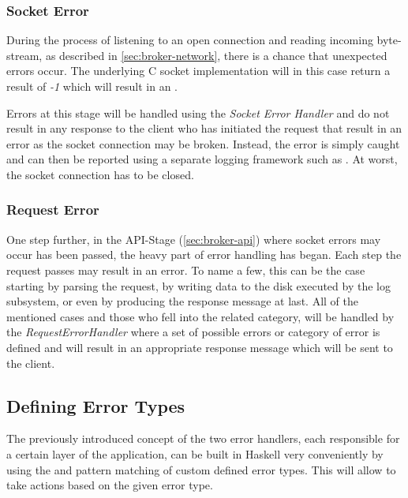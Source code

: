 \subsubsection{Socket Error}

During the process of listening to an open connection and reading incoming
byte-stream, as described in \ref{sec:broker-network}, there is a chance that
unexpected errors occur. The underlying C socket implementation will in this
case return a result of \textit{-1} which will result in an
. 

Errors at this stage will be handled using the \textit{Socket Error Handler} and
do not result in any response to the client who has initiated the request that
result in an error as the socket connection may be broken. Instead, the error is
simply caught and can then be reported using a separate logging framework such
as . At worst, the
socket connection has to be closed.

\subsubsection{Request Error}

One step further, in the API-Stage (\ref{sec:broker-api}) where socket errors
may occur has been passed, the heavy part of error handling has began. Each step
the request passes may result in an error. To name a few, this can be the case
starting by parsing the request, by writing data to the disk executed by the log
subsystem, or even by producing the response message at last. All of the
mentioned cases and those who fell into the related category, will be handled by
the \textit{RequestErrorHandler} where a set of possible errors or category of
error is defined and will result in an appropriate response message which will
be sent to the client.


\subsection{Defining Error Types}

The previously introduced concept of the two error handlers, each responsible
for a certain layer of the application, can be built in Haskell very
conveniently by using the 
and pattern matching of custom defined error types. This will allow to take
actions based on the given error type.  


